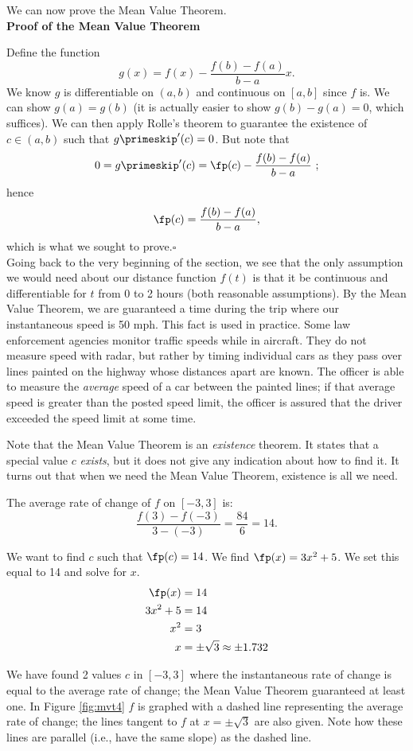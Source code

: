 We can now prove the Mean Value Theorem.\\

\noindent\textbf{Proof of the Mean Value Theorem}

Define the function $$g(x) = f(x) - \frac{f(b)-f(a)}{b-a}x.$$  We know $g$ is differentiable on $(a,b)$ and  continuous on $[a,b]$ since $f$ is. We can show $g(a)=g(b)$ (it is actually easier to show $g(b)-g(a)=0$, which suffices). We can then apply Rolle's theorem to guarantee the existence of $c \in (a,b)$ such that $g\primeskip'(c) = 0$.  But note that $$0= g\primeskip'(c) = \fp(c) - \frac{f(b)-f(a)}{b-a} \ ;$$ hence $$\fp(c) = \frac{f(b)-f(a)}{b-a},$$ which is what we sought to prove.\hfill $\square$\\

Going back to the very beginning of the section, we see that the only assumption we would need about our distance function $f(t)$ is that it be continuous and differentiable for $t$ from 0 to 2 hours (both reasonable assumptions).  By the Mean Value Theorem, we are guaranteed a time during the trip where our instantaneous speed is 50 mph. This fact is used in practice. Some law enforcement agencies monitor traffic speeds while in aircraft. They do not measure speed with radar, but rather by timing individual cars as they pass over lines painted on the highway whose distances apart are known. The officer is able to measure the \textit{average} speed of a car between the painted lines; if that average speed is greater than the posted speed limit, the officer is assured that the driver exceeded the speed limit at some time.

Note that the Mean Value Theorem is an \textit{existence} theorem. It states that a special value $c$ \textit{exists}, but it does not give any indication about how to find it. It turns out that when we need the Mean Value Theorem, existence is all we need.\\

{The average rate of change of $f$ on $[-3,3]$ is:
		$$\frac{f(3)-f(-3)}{3-(-3)} = \frac{84}{6} = 14.$$
		
We want to find $c$ such that $\fp(c) = 14$. We find $\fp(x) = 3x^2+5$. We set this equal to 14 and solve for $x$. 
		\begin{align*}
		\fp(x) &= 14 \\
		3x^2 +5 &= 14\\
		x^2  &= 3\\
		x &= \pm \sqrt{3} \approx \pm 1.732
		\end{align*}
		
We have found 2 values $c$ in $[-3,3]$ where the instantaneous rate of change is equal to the average rate of change; the Mean Value Theorem guaranteed at least one. In Figure \ref{fig:mvt4} $f$ is graphed with a dashed line representing the average rate of change; the lines tangent to $f$ at $x=\pm \sqrt{3}$ are also given. Note how these lines are parallel (i.e., have the same slope) as the dashed line.
}\\

